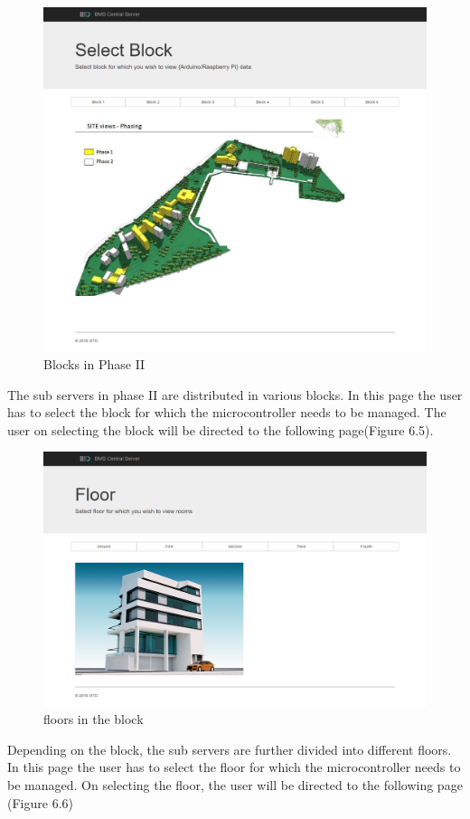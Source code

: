 \documentclass[letterpaper,11pt]{report}
\begin{document}
\begin{figure}[h]
\includegraphics[width=\textwidth]{block}
\centering
\captionsetup{justification=centering}
\caption{Blocks in Phase II}
\label{fig:block}
\end{figure}
The sub servers in phase II are distributed in various blocks. In this page the user has to select the block for which the microcontroller needs to be managed. The user on selecting the block will be directed to the following page(Figure 6.5).
\newpage
\begin{figure}[h]
\includegraphics[width=\textwidth]{floor}
\centering
\captionsetup{justification=centering}
\caption{floors in the block}
\label{fig:floor}
\end{figure}
Depending on the block, the sub servers are further divided into different floors. In this page the user has to select the floor for which the microcontroller needs to be managed. On selecting the floor, the user will be directed to the following page (Figure 6.6)
\end{document}
